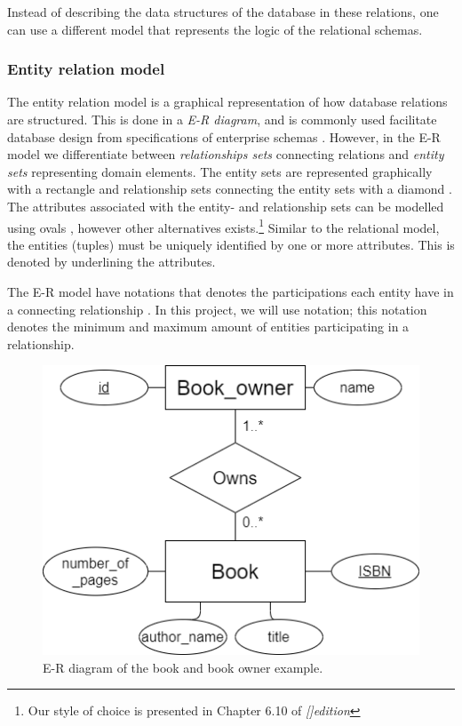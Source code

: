 Instead of describing the data structures of the database in these relations, one can use a different model that represents the logic of the relational schemas.

\subsubsection{Entity relation model}\label{sec:EntityRelationModel}
The entity relation model is a graphical representation of how database relations are structured.
This is done in a \textit{E-R diagram}, and is commonly used facilitate database design from specifications of enterprise schemas \cite*[Chapter 6.2]{DBSBook}.
However, in the E-R model we differentiate between \textit{relationships sets} connecting relations and \textit{entity sets} representing domain elements. 
The entity sets are represented graphically with a rectangle and relationship sets connecting the entity sets with a diamond \cite[Chapter 6.2]{DBSBook}.
The attributes associated with the entity- and relationship sets can be modelled using ovals \cite{KatjaFirstPP}, however other alternatives exists.\footnote{Our style of choice is presented in Chapter 6.10 of  \textit{[]{edition}}}
Similar to the relational model, the entities (tuples) must be uniquely identified by one or more attributes. This is denoted by underlining the attributes. 

The E-R model have notations that denotes the participations each entity have in a connecting relationship \cite[Chapter 6.4]{DBSBook}.
In this project, we will use  notation; this notation denotes the minimum and maximum amount of entities participating in a relationship. 

\begin{figure}[htp]
    \centering
    \includegraphics[scale=0.5]{Images/book_example_w_cardinality.png}
    \caption{E-R diagram of the book and book owner example.}
    \label{fig:ER_Book_Example}
\end{figure}

